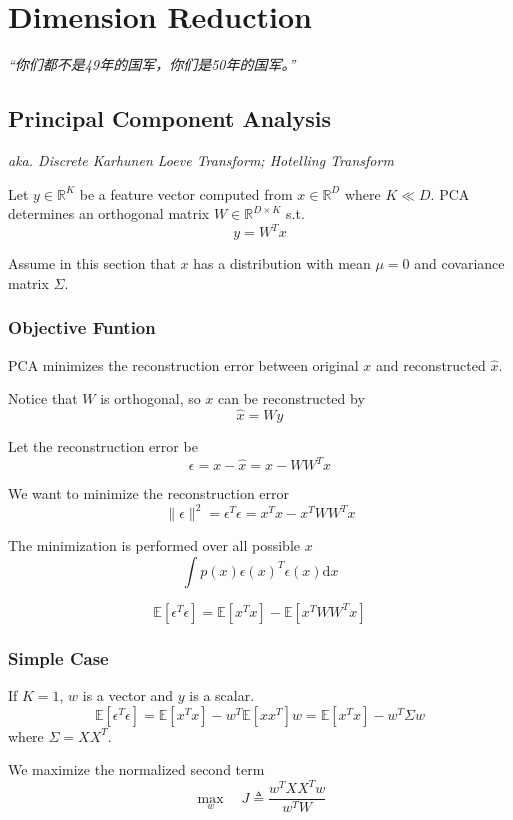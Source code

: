 \chapter{Dimension Reduction}
\emph{“你们都不是49年的国军，你们是50年的国军。”}
\newpage


\section{Principal Component Analysis}
    \emph{aka. Discrete Karhunen Loeve Transform; Hotelling Transform}

    Let $y \in \mathbb{R}^K$ be a feature vector computed from $x \in \mathbb{R}^D$ where $K \ll D$. PCA determines an orthogonal matrix $W \in \mathbb{R}^{D \times K}$ s.t.
    \[ y = W^Tx \]

    Assume in this section that $x$ has a distribution with mean $\mu=0$ and covariance matrix $\Sigma$.

    \subsection{Objective Funtion}
        PCA minimizes the reconstruction error between original $x$ and reconstructed $\hat{x}$.

        Notice that $W$ is orthogonal, so $x$ can be reconstructed by
        \[ \hat{x} = Wy \]

        Let the reconstruction error be
        \[ \epsilon = x - \hat{x} = x - WW^Tx \]

        We want to minimize the reconstruction error
        \[ \|\epsilon\|^2 = \epsilon^T\epsilon = x^Tx - x^TWW^Tx \]

        The minimization is performed over all possible $x$
        \[ \int p(x)\epsilon(x)^T\epsilon(x)\mathrm{d}x \]

        \[ \mathbb{E}[\epsilon^T\epsilon] = \mathbb{E}[x^Tx] - \mathbb{E}[x^TWW^Tx]\]

    \subsection{Simple Case}
        If $K=1$, $w$ is a vector and $y$ is a scalar.
        \[\mathbb{E}[\epsilon^T\epsilon] = \mathbb{E}[x^Tx]-w^T\mathbb{E}[xx^T]w = \mathbb{E}[x^Tx] - w^T \Sigma w\]
        where $\Sigma = XX^T$.

        We maximize the normalized second term
        \[ \max_w \quad J \triangleq \frac{w^TXX^Tw}{w^TW} \]

